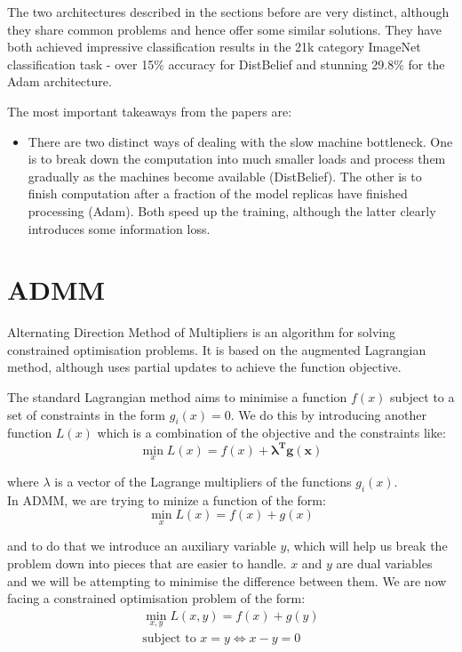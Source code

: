 \documentclass[a4paper, 11pt]{article}
\numberwithin{equation}{section}
\begin{document}
	The two architectures described in the sections before are very distinct, although they share common problems and hence offer some similar solutions. They have both achieved impressive classification results in the 21k category ImageNet classification task - over 15\% accuracy for DistBelief and stunning 29.8\% for the Adam architecture.
	
	The most important takeaways from the papers are:
	\begin{itemize}
		\item There are two distinct ways of dealing with the slow machine bottleneck. One is to break down the computation into much smaller loads and process them gradually as the machines become available (DistBelief). The other is to finish computation after a fraction of the model replicas have finished processing (Adam). Both speed up the training, although the latter clearly introduces some information loss.
	\end{itemize}
	
	\section{ADMM}
	\label{ADMM}
	
	Alternating Direction Method of Multipliers is an algorithm for solving constrained optimisation problems. It is based on the augmented Lagrangian method, although uses partial updates to achieve the function objective.
	
	The standard Lagrangian method aims to minimise a function $f(x)$ subject to a set of constraints in the form $g_i(x)=0$. We do this by introducing another function $L(x)$ which is a combination of the objective and the constraints like:
	\begin{equation}
	\min_{x} L(x) = f(x) + \boldsymbol{\lambda^T g(x)}
	\end{equation}
	
	where $\lambda$ is a vector of the Lagrange multipliers of the functions $g_i(x)$.\\
	
	In ADMM, we are trying to minize a function of the form:
	\begin{equation}
	\min_{x} L(x) = f(x) + g(x)
	\end{equation}
	
	and to do that we introduce an auxiliary variable $y$, which will help us break the problem down into pieces that are easier to handle. $x$ and $y$ are dual variables and we will be attempting to minimise the difference between them. We are now facing a constrained optimisation problem of the form:
	\begin{align}
	\min_{x,y} L(x,y) = f(x) + g(y) \\
	\textrm{subject to } x = y \Leftrightarrow x-y=0
	\end{align}
	
\end{document}

